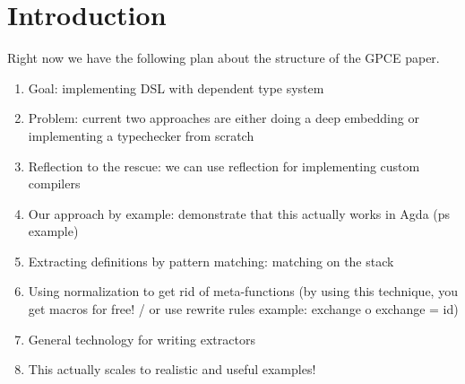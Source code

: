 \documentclass[sigplan,anonymous,review]{acmart}
\begin{document}
\begin{abstract}
%
\end{abstract}
\maketitle

\section{Introduction}
Right now we have the following plan about the structure of the GPCE paper.
\begin{enumerate}
    \item Goal: implementing DSL with dependent type system 
    \item Problem: current two approaches are either doing a deep embedding or
        implementing a typechecker from scratch
    \item Reflection to the rescue: we can use reflection for implementing
        custom compilers 
    \item Our approach by example: demonstrate that this actually works in Agda
        (ps example)
    \item Extracting definitions by pattern matching: matching on the stack
    \item Using normalization to get rid of meta-functions (by using this
        technique, you get macros for free! / or use rewrite rules example:
        exchange o exchange = id)
    \item General technology for writing extractors
    \item This actually scales to realistic and useful examples!
\end{enumerate}
\end{document}
